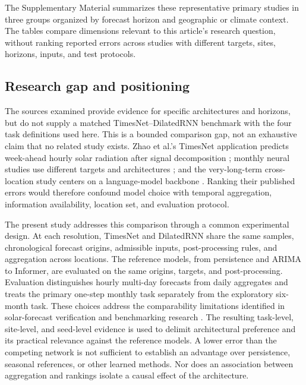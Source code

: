 The Supplementary Material summarizes these representative primary studies
in three groups organized by forecast horizon and geographic or climate
context. The tables compare dimensions relevant to this article's research
question, without ranking reported errors across studies with different
targets, sites, horizons, inputs, and test protocols.

\subsection{Research gap and positioning}

The sources examined provide evidence for specific architectures and
horizons, but do not supply a matched TimesNet--DilatedRNN benchmark with
the four task definitions used here. This is a bounded comparison gap,
not an exhaustive claim that no related study exists. Zhao et al.'s TimesNet
application predicts week-ahead hourly solar radiation after signal
decomposition \cite{zhao2024timesnet}; monthly neural studies use different
targets and architectures \cite{ozoegwu2019}; and the very-long-term
cross-location study centers on a language-model backbone
\cite{cabral2026}. Ranking their published errors would therefore confound
model choice with temporal aggregation, information availability, location
set, and evaluation protocol.

The present study addresses this comparison through a common experimental
design. At each resolution, TimesNet and DilatedRNN share the same samples,
chronological forecast origins, admissible inputs, post-processing rules,
and aggregation across locations. The reference models, from persistence
and ARIMA to Informer, are evaluated on the same origins, targets, and
post-processing. Evaluation distinguishes hourly
multi-day forecasts from daily aggregates and treats the primary one-step
monthly task separately from the exploratory six-month task. These choices
address the comparability limitations identified in solar-forecast
verification and benchmarking research
\cite{yang2020verification,voyant2022}.
The resulting task-level, site-level, and seed-level evidence is used to
delimit architectural preference and its practical relevance against the
reference models. A lower error than the competing network is not sufficient
to establish an advantage over persistence, seasonal references, or other
learned methods. Nor does an association between aggregation and rankings
isolate a causal effect of the architecture.
